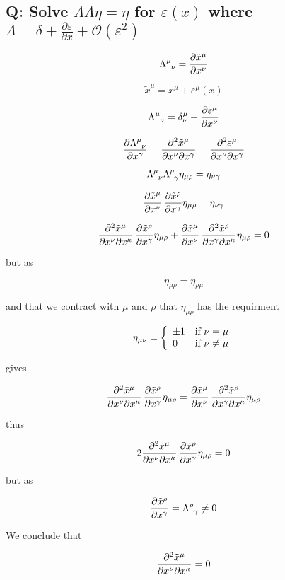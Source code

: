 
\subsection{Q: Solve $\Lambda\Lambda\eta=\eta$ for $\varepsilon(x)$ where $\Lambda=\delta+\frac{\partial \varepsilon}{\partial x}+\mathcal{O}(\varepsilon^2)$}\label{sec:A24}

$$\Lambda\ein{\mu}{\nu}=\pder{\tilde{x}^\mu}{x^\nu}$$

$$\tilde{x}^\mu=x^\mu+\varepsilon^\mu(x)$$

$$\Lambda\ein{\mu}{\nu}=\delta^\mu_\nu+\pder{\varepsilon^\mu}{x^\nu}$$

$$\pder{\Lambda\ein{\mu}{\nu}}{x^{\gamma}}=\ppder{\tilde{x}^\mu}{x^\nu}{x^\gamma}=\ppder{\varepsilon^\mu}{x^\nu}{x^\gamma}$$



$$\Lambda\ein{\mu}{\nu}\Lambda\ein{\rho}{\gamma}\eta_{\mu\rho}=\eta_{\nu\gamma}$$


$$\frac{\partial \tilde{x}^\mu}{\partial x^\nu}\,\frac{\partial \tilde{x}^\rho}{\partial x^\gamma}\eta_{\mu\rho}=\eta_{\nu\gamma}$$


$$
\frac{\partial^2 \tilde{x}^\mu}{\partial x^\nu \partial x^\kappa}\,\frac{\partial \tilde{x}^\rho}{\partial x^\gamma}\eta_{\mu\rho}
+\frac{\partial \tilde{x}^\mu}{\partial x^\nu}\,\frac{\partial^2 \tilde{x}^\rho}{\partial x^\gamma \partial x^\kappa}\eta_{\mu\rho}=0
$$

but as

$$\eta_{\mu\rho}=\eta_{\rho\mu}$$

and that we contract with $\mu$ and $\rho$ that $\eta_{\mu\rho}$ has the requirment

\[\eta_{\mu\nu} = \left\{
  \begin{array}{lr}
    \pm1 & $if $ \nu=\mu\\
    0 & $if $ \nu\neq\mu
  \end{array}
\right.
\]

gives

$$\frac{\partial^2 \tilde{x}^\mu}{\partial x^\nu \partial x^\kappa}\,\frac{\partial \tilde{x}^\rho}{\partial x^\gamma}\eta_{\mu\rho}=\frac{\partial \tilde{x}^\mu}{\partial x^\nu}\,\frac{\partial^2 \tilde{x}^\rho}{\partial x^\gamma \partial x^\kappa}\eta_{\mu\rho}$$

thus


$$
2\frac{\partial^2 \tilde{x}^\mu}{\partial x^\nu \partial x^\kappa}\,\frac{\partial \tilde{x}^\rho}{\partial x^\gamma}\eta_{\mu\rho}=0
$$

but as

$$\pder{\tilde{x}^\rho}{x^\gamma}=\Lambda\ein{\rho}{\gamma}\neq0$$

We conclude that 

$$\frac{\partial^2 \tilde{x}^\mu}{\partial x^\nu \partial x^\kappa}=0$$

